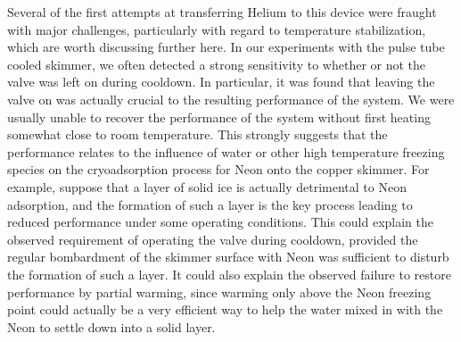 Several of the first attempts at transferring Helium to this device were fraught with major challenges, particularly with regard to temperature stabilization, which are worth discussing further here.
In our experiments with the pulse tube cooled skimmer, we often detected a strong sensitivity to whether or not the valve was left on during cooldown.
In particular, it was found that leaving the valve on was actually crucial to the resulting performance of the system.
We were usually unable to recover the performance of the system without first heating somewhat close to room temperature.
This strongly suggests that the performance relates to the influence of water or other high temperature freezing species on the cryoadsorption process for Neon onto the copper skimmer.
For example, suppose that a layer of solid ice is actually detrimental to Neon adsorption, and the formation of such a layer is the key process leading to reduced performance under some operating conditions.
This could explain the observed requirement of operating the valve during cooldown, provided the regular bombardment of the skimmer surface with Neon was sufficient to disturb the formation of such a layer.
It could also explain the observed failure to restore performance by partial warming, since warming only above the Neon freezing point could actually be a very efficient way to help the water mixed in with the Neon to settle down into a solid layer.


